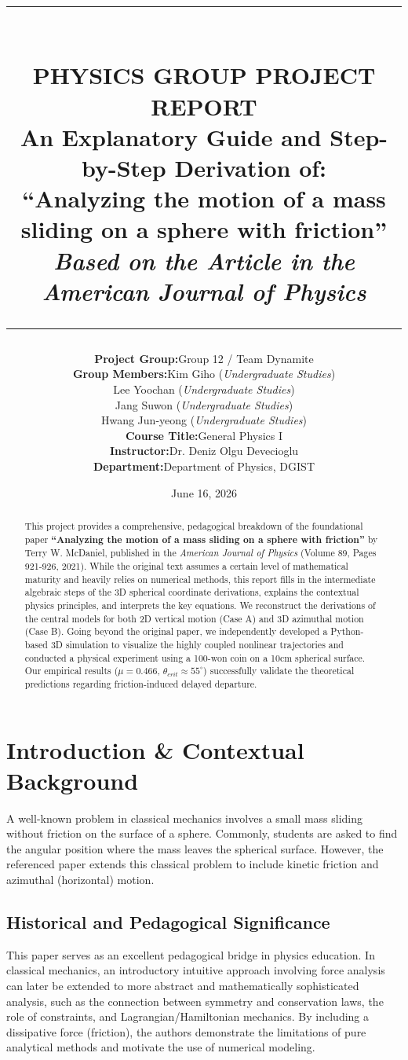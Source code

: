 \documentclass[11pt,letterpaper]{article}
\title{
    \vspace{-1.5in}
    \rule{\linewidth}{1.5pt} \\ \vspace{4mm}
    \large\textbf{PHYSICS GROUP PROJECT REPORT} \\ \vspace{2mm}
    \Large\textbf{An Explanatory Guide and Step-by-Step Derivation of: \\ ``Analyzing the motion of a mass sliding on a sphere with friction''} \\ \vspace{4mm}
    \large\textit{Based on the Article in the American Journal of Physics} \\
    \rule{\linewidth}{1.5pt}
}
\author{
    \begin{tabular}{r @{\quad} l}
        \textbf{Project Group:} & Group 12 / Team Dynamite \\[1ex]
        \textbf{Group Members:} & Kim Giho (\textit{Undergraduate Studies}) \\
                                & Lee Yoochan (\textit{Undergraduate Studies}) \\
                                & Jang Suwon (\textit{Undergraduate Studies}) \\
                                & Hwang Jun-yeong (\textit{Undergraduate Studies}) \\[1ex]
        \textbf{Course Title:}  & General Physics I \\
        \textbf{Instructor:}    & Dr. Deniz Olgu Devecioglu \\
        \textbf{Department:}    & Department of Physics, DGIST
    \end{tabular}
}
\date{June 16, 2026}
\begin{document}
\maketitle

\begin{abstract}
This project provides a comprehensive, pedagogical breakdown of the foundational paper \textbf{``Analyzing the motion of a mass sliding on a sphere with friction''} by Terry W. McDaniel, published in the \textit{American Journal of Physics} (Volume 89, Pages 921-926, 2021). While the original text assumes a certain level of mathematical maturity and heavily relies on numerical methods, this report fills in the intermediate algebraic steps of the 3D spherical coordinate derivations, explains the contextual physics principles, and interprets the key equations. We reconstruct the derivations of the central models for both 2D vertical motion (Case A) and 3D azimuthal motion (Case B). Going beyond the original paper, we independently developed a Python-based 3D simulation to visualize the highly coupled nonlinear trajectories and conducted a physical experiment using a 100-won coin on a 10cm spherical surface. Our empirical results ($\mu = 0.466$, $\theta_{crit} \approx 55^\circ$) successfully validate the theoretical predictions regarding friction-induced delayed departure.
\end{abstract}

\tableofcontents
\newpage

\section{Introduction \& Contextual Background}

A well-known problem in classical mechanics involves a small mass sliding without friction on the surface of a sphere. Commonly, students are asked to find the angular position where the mass leaves the spherical surface. However, the referenced paper extends this classical problem to include kinetic friction and azimuthal (horizontal) motion. 

\subsection{Historical and Pedagogical Significance}
This paper serves as an excellent pedagogical bridge in physics education. In classical mechanics, an introductory intuitive approach involving force analysis can later be extended to more abstract and mathematically sophisticated analysis, such as the connection between symmetry and conservation laws, the role of constraints, and Lagrangian/Hamiltonian mechanics. By including a dissipative force (friction), the authors demonstrate the limitations of pure analytical methods and motivate the use of numerical modeling.
\end{document}
